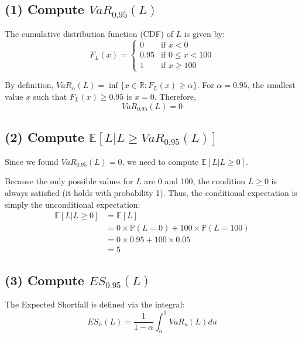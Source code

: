 \subsection*{(1) Compute $VaR_{0.95}(L)$}

The cumulative distribution function (CDF) of $L$ is given by:
\begin{equation*}
F_L(x) = 
\begin{cases} 
0 & \text{if } x < 0 \\
0.95 & \text{if } 0 \le x < 100 \\
1 & \text{if } x \ge 100 
\end{cases}
\end{equation*}

By definition, $VaR_{\alpha}(L) = \inf\{x \in \mathbb{R} : F_L(x) \ge \alpha\}$. 
For $\alpha = 0.95$, the smallest value $x$ such that $F_L(x) \ge 0.95$ is $x = 0$. 
Therefore,
\begin{equation*}
VaR_{0.95}(L) = 0
\end{equation*}


\subsection*{(2) Compute $\mathbb{E}[L|L\ge VaR_{0.95}(L)]$}

Since we found $VaR_{0.95}(L) = 0$, we need to compute $\mathbb{E}[L | L \ge 0]$.

Because the only possible values for $L$ are 0 and 100, the condition $L \ge 0$ is always satisfied (it holds with probability 1). Thus, the conditional expectation is simply the unconditional expectation:
\begin{align*}
\mathbb{E}[L | L \ge 0] &= \mathbb{E}[L] \\
&= 0 \times \mathbb{P}(L = 0) + 100 \times \mathbb{P}(L = 100) \\
&= 0 \times 0.95 + 100 \times 0.05 \\
&= 5
\end{align*}


\subsection*{(3) Compute $ES_{0.95}(L)$}

The Expected Shortfall is defined via the integral:
\begin{equation*}
ES_{\alpha}(L) = \frac{1}{1-\alpha}\int_{\alpha}^1 VaR_u(L) du
\end{equation*}

